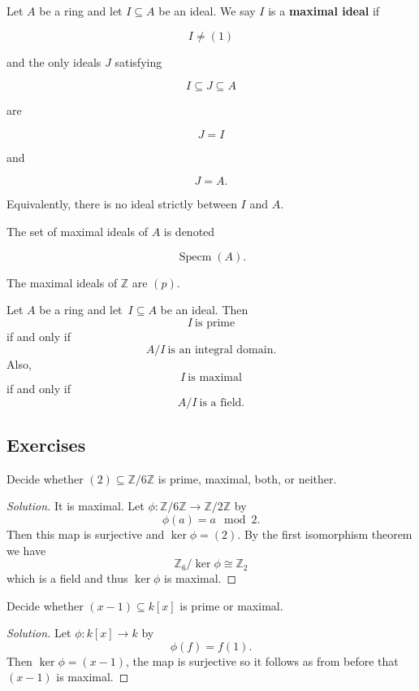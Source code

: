 \documentclass[11pt]{article}
\begin{document}
\begin{defn}
    Let $A$ be a ring and let $I\subseteq A$ be an ideal. 
    We say $I$ is a \textbf{maximal ideal} if

    $$I\neq(1)$$

    and the only ideals $J$ satisfying

    $$I\subseteq J\subseteq A$$

    are

    $$J=I$$

    and

    $$J=A.$$

    Equivalently, there is no ideal strictly between $I$ and $A$.

    The set of maximal ideals of $A$ is denoted

    $$\operatorname{Specm}(A).$$
\end{defn}
\begin{ex}
    The maximal ideals of $\mathbb Z$ are $(p)$. 
\end{ex} 

\begin{thm}
    Let $A$ be a ring and let $I \subseteq A$ be an ideal. 
    Then 
    \[
        I \ \text{is prime}
    \]
    if and only if 
    \[
        A/I \ \text{is an integral domain}.
    \]
    Also, 
    \[
        I \ \text{is maximal}
    \]
    if and only if 
    \[
        A/I \ \text{is a field}. 
    \]
\end{thm}

\subsection*{Exercises}

\begin{prob}
    Decide whether $(2) \subseteq \mathbb Z/6\mathbb Z$ 
    is prime, maximal, both, or neither. 
\end{prob}
\begin{proof}[Solution]
    It is maximal. 
    Let $\phi : \mathbb Z/6\mathbb Z \to \mathbb Z/2\mathbb Z$ 
    by 
    \[
        \phi(a) = a \mod 2. 
    \]
    Then this map is surjective and 
    $\ker \phi = (2)$. By the first isomorphism theorem we 
    have 
    \[
        \mathbb Z_6/\ker \phi \cong \mathbb Z_2
    \]
    which is a field and thus $\ker \phi$ is maximal.  
\end{proof}

\begin{prob}
    Decide whether $(x-1) \subseteq k[x]$ is prime or maximal. 
\end{prob}
\begin{proof}[Solution]
    Let $\phi : k[x] \to k$ by 
    \[
        \phi(f) = f(1). 
    \]
    Then $\ker \phi = (x-1)$, the map is surjective so 
    it follows as from before that $(x-1)$ is maximal. 
\end{proof}
\end{document}
